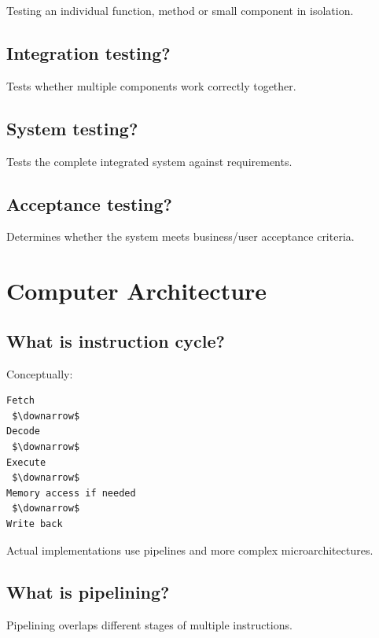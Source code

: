Testing an individual function, method or small component in isolation.

\medskip

\subsection{Integration testing?}

Tests whether multiple components work correctly together.

\medskip

\subsection{System testing?}

Tests the complete integrated system against requirements.

\medskip

\subsection{Acceptance testing?}

Determines whether the system meets business/user acceptance criteria.

\medskip

\section{Computer Architecture}

\subsection{What is instruction cycle?}

Conceptually:

\begin{lstlisting}
Fetch
 $\downarrow$
Decode
 $\downarrow$
Execute
 $\downarrow$
Memory access if needed
 $\downarrow$
Write back
\end{lstlisting}

Actual implementations use pipelines and more complex microarchitectures.

\medskip

\subsection{What is pipelining?}

Pipelining overlaps different stages of multiple instructions.

